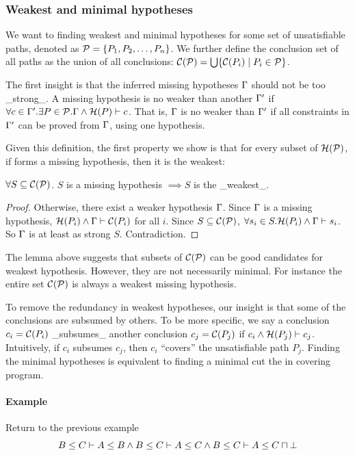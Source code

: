 \subsubsection{Weakest and minimal hypotheses}

We want to finding weakest and minimal
hypotheses for some set of unsatisfiable paths, denoted as
$\mathcal{P}=\{P_1, P_2, \dots, P_n\}$. We further define the conclusion
set of all paths as the union of all conclusions:
$\mathcal{C}(\mathcal{P})=\bigcup\{\mathcal{C}(P_i) \mid P_i\in \mathcal{P}\}$.

The first insight is that the inferred missing hypotheses $\Gamma$ should
not be too _strong_. A missing hypothesis is no weaker
than another $\Gamma'$ if $\forall c\in \Gamma'.\exists P\in \mathcal{P}.  \Gamma
\land \mathcal{H}(P) \vdash c$. That is, $\Gamma$ is no weaker than
$\Gamma'$ if all constraints in $\Gamma'$ can be proved from $\Gamma$,
using one hypothesis.

Given this definition, the first property we show is that for every
subset of $\mathcal{H}(\mathcal{P})$, if forms a missing hypothesis, then it
is the weakest:
%
\begin{Lemma}
\label{lemma:weakest}
$\forall S\subseteq \mathcal{C}(\mathcal{P})$. $S$ is a missing hypothesis
$\implies S$ is the _weakest_.
\end{Lemma}
\begin{proof}
Otherwise, there exist a weaker hypothesis $\Gamma$. Since $\Gamma$ is a
missing hypothesis, $\mathcal{H}(P_i) \land \Gamma\vdash \mathcal{C}(P_i)$  for
all $i$. Since $S\subseteq \mathcal{C}(\mathcal{P})$, $\forall s_i\in S.
\mathcal{H}(P_i) \land \Gamma\vdash s_i$. So $\Gamma$ is at least as strong $S$.
Contradiction.
\end{proof}
%
%
The lemma above suggests that subsets of $\mathcal{C}(\mathcal{P})$ can be
good candidates for weakest hypothesis. However, they are not
necessarily minimal. For instance the entire set $\mathcal{C}(\mathcal{P})$
is always a weakest missing hypothesis. 

To remove the redundancy in weakest hypotheses, our insight is that
some of the conclusions are subsumed by others. 
%
To be more specific, we say a conclusion $c_i=\mathcal{C}(P_i)$
_subsumes_ another conclusion $c_j=\mathcal{C}(P_j)$ if $c_i \land
\mathcal{H}(P_j) \vdash c_j$. Intuitively, if $c_i$ subsumes $c_j$, then
$c_i$ ``covers'' the unsatisfiable path $P_j$. Finding the minimal
hypotheses is equivalent to finding a minimal cut the in covering
program.

\paragraph{Example} Return to the previous example \[B\leq C \vdash
A\leq B \land B\leq C \vdash A\leq C \land B\leq C \vdash A\leq
C\sqcap \bot \]

